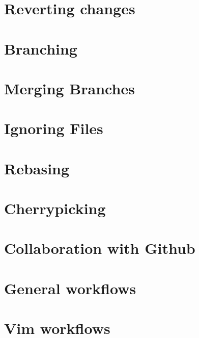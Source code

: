 \documentclass{amsart}
\begin{document}
\newpage

\section*{Reverting changes}

\newpage

\section*{Branching}

\newpage

\section*{Merging Branches}

\newpage

\section*{Ignoring Files}

\newpage

\section*{Rebasing}

\newpage

\section*{Cherrypicking}

\newpage

\section*{Collaboration with Github}

\newpage

\section*{General workflows}

\newpage

\section*{Vim workflows}
\end{document}
